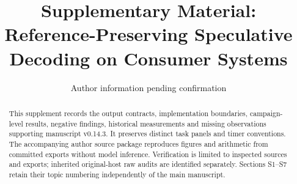 \documentclass[preprint,12pt,nopreprintline]{elsarticle}
\begin{document}
\begin{frontmatter}
\title{Supplementary Material: Reference-Preserving Speculative Decoding on Consumer Systems}
\author{Author information pending confirmation}
\begin{abstract}
This supplement records the output contracts, implementation boundaries, campaign-level results, negative findings, historical measurements and missing observations supporting manuscript v0.14.3. It preserves distinct task panels and timer conventions. The accompanying author source package reproduces figures and arithmetic from committed exports without model inference. Verification is limited to inspected sources and exports; inherited original-host raw audits are identified separately. Sections S1--S7 retain their topic numbering independently of the main manuscript.
\end{abstract}
\end{frontmatter}
\renewcommand{\thesection}{S\arabic{section}}
\renewcommand{\thetable}{S\arabic{table}}
\renewcommand{\theequation}{S\arabic{equation}}
\setcounter{tocdepth}{2}
\clearpage
\tableofcontents
\clearpage







\begingroup\small

\endgroup
\end{document}
